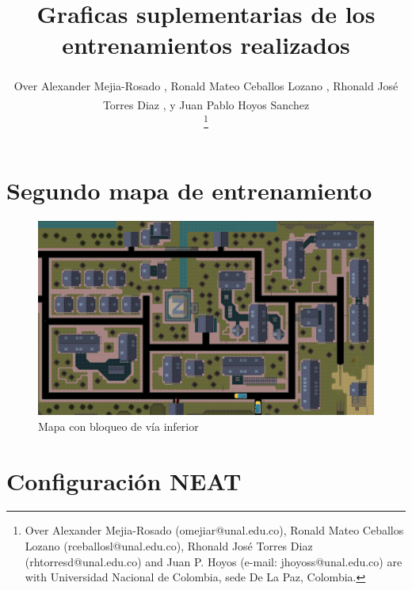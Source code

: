 \documentclass[lettersize, journal]{IEEEtran}
\begin{document}
\title{Graficas suplementarias de los entrenamientos realizados}


\author{Over Alexander Mejia-Rosado \textsuperscript{\href{https://orcid.org/0009-0008-8152-2754}{\textcolor{orcidcolor}{\faOrcid}}}, 
Ronald Mateo Ceballos Lozano \textsuperscript{\href{https://orcid.org/0009-0003-6478-3286}{\textcolor{orcidcolor}{\faOrcid}}}, 
Rhonald José Torres Diaz \textsuperscript{\href{mailto:rhtorresd@unal.edu.co}{\textcolor{orcidcolor}{}}}, y 
Juan Pablo Hoyos Sanchez \textsuperscript{\href{mailto:jhoyoss@unal.edu.co}{\textcolor{orcidcolor}{}}}

\thanks{Over Alexander Mejia-Rosado (omejiar@unal.edu.co), Ronald Mateo Ceballos Lozano (rceballosl@unal.edu.co), Rhonald José Torres Diaz (rhtorresd@unal.edu.co) and Juan P. Hoyos (e-mail: jhoyoss@unal.edu.co) are with Universidad Nacional de Colombia, sede De La Paz, Colombia.}%
}

\maketitle
\section{Segundo mapa de entrenamiento}
\setcounter{figure}{0}
\renewcommand{\thefigure}{S\arabic{figure}-MAP}
\begin{figure}[H]
    \centering    \includegraphics[width=1\linewidth]{Simulacion/gta.png}
    \caption{Mapa con bloqueo de vía inferior}
    \label{fig:mapa2}
\end{figure}

\section{Configuración NEAT}
\end{document}
